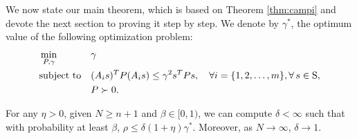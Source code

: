 We now state our main theorem, which is based on Theorem \ref{thm:campi} and devote the next section to proving it step by step. We denote by $\gamma^*$, the optimum value of the following optimization problem:
\begin{equation}
\begin{aligned}
& \min_{P, \gamma} & & \gamma \\
& \text{subject to} 
&  & (A_is)^TP(A_is) \leq \gamma^2 s^TPs, \quad \forall i = \{1,2, \ldots, m\},  \forall\, s \in \text{S},\\
& && P \succ 0. \\
\end{aligned}
\end{equation}

\begin{theorem} \label{thm:mainTheorem} For any $\eta > 0$, given $N \geq n+1$ and $\beta \in [0,1)$, we can compute $\delta < \infty$ such that with probability at least $\beta$, $\rho \leq \delta (1 + \eta) \gamma^*$. Moreover, as $N \to \infty$, $\delta \to 1$.
\end{theorem}
